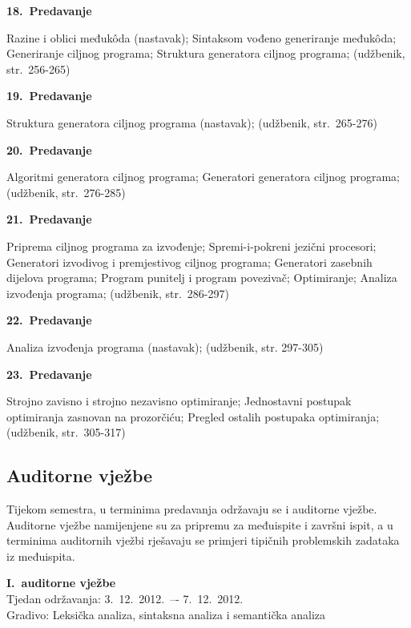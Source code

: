 \documentclass[times, 12pt, utf8]{book}
\newenvironment{myindentpar}[1]%
{\begin{list}{}%
         {\setlength{\leftmargin}{#1}}%
         \item[]%
}
{\end{list}}
\begin{document}
\textbf{18.~Predavanje}
\begin{myindentpar}{30pt}
Razine i oblici međukôda (nastavak); Sintaksom vođeno generiranje međukôda; Generiranje ciljnog programa; Struktura generatora ciljnog programa; (udžbenik, str.~256-265)
\end{myindentpar}

\textbf{19.~Predavanje}
\begin{myindentpar}{30pt}
Struktura generatora ciljnog programa (nastavak); (udžbenik, str.~265-276) 
\end{myindentpar}

\textbf{20.~Predavanje}
\begin{myindentpar}{30pt}
Algoritmi generatora ciljnog programa; Generatori generatora ciljnog programa; (udžbenik, str.~276-285) 
\end{myindentpar}

\textbf{21.~Predavanje}
\begin{myindentpar}{30pt}
Priprema ciljnog programa za izvođenje; Spremi-i-pokreni jezični procesori; Generatori izvodivog i premjestivog ciljnog programa; Generatori zasebnih dijelova programa; Program punitelj i program povezivač; Optimiranje; Analiza izvođenja programa; (udžbenik, str.~286-297)
\end{myindentpar}

\textbf{22.~Predavanje}
\begin{myindentpar}{30pt}
Analiza izvođenja programa (nastavak); (udžbenik, str. 297-305)
\end{myindentpar}

\textbf{23.~Predavanje}
\begin{myindentpar}{30pt}
Strojno zavisno i strojno nezavisno optimiranje; Jednostavni postupak optimiranja zasnovan na prozorčiću; Pregled ostalih postupaka optimiranja; (udžbenik, str.~305-317)
\end{myindentpar}

\cleardoublepage  
{}  
{}
\subsection*{Auditorne vježbe}

Tijekom semestra, u terminima predavanja održavaju se i auditorne vježbe.
Auditorne vježbe namijenjene su za pripremu za međuispite i završni ispit, a u terminima auditornih vježbi rješavaju se primjeri tipičnih problemskih zadataka iz međuispita.

\textbf{I.~auditorne vježbe} \\
Tjedan održavanja: 3.~12.~2012.~–- 7.~12.~2012. \\
Gradivo: Leksička analiza, sintaksna analiza i semantička analiza
\end{document}
